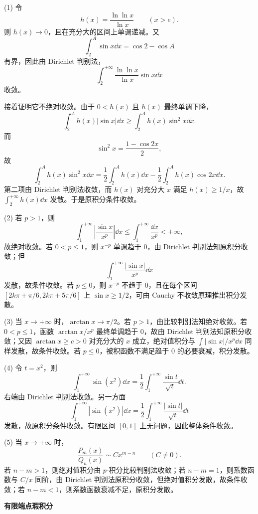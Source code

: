 \begin{solution}
	(1) 令
	\[
	h(x)=\frac{\ln\ln x}{\ln x}\qquad (x>e).
	\]
	则 $h(x)\to0$，且在充分大的区间上单调递减。又
	\[
	\int_2^A\sin x\dd x=\cos2-\cos A
	\]
	有界，因此由 Dirichlet 判别法，
	\[
	\int_2^{+\infty}\frac{\ln\ln x}{\ln x}\sin x\dd x
	\]
	收敛。
	
	接着证明它不绝对收敛。由于 $0<h(x)$ 且 $h(x)$ 最终单调下降，
	\[
	\int_2^A h(x)|\sin x|\dd x
	\geq \int_2^A h(x)\sin^2x\dd x.
	\]
	而
	\[
	\sin^2x=\frac{1-\cos2x}{2},
	\]
	故
	\[
	\int_2^A h(x)\sin^2x\dd x
	=\frac12\int_2^A h(x)\dd x-\frac12\int_2^A h(x)\cos2x\dd x.
	\]
	第二项由 Dirichlet 判别法收敛，而 $h(x)$ 对充分大 $x$ 满足 $h(x)\geq 1/x$，故 $\displaystyle\int_2^{+\infty}h(x)\dd x$ 发散。于是原积分条件收敛。
	
	(2) 若 $p>1$，则
	\[
	\int_1^{+\infty}\left|\frac{\sin x}{x^p}\right|\dd x
	\leq \int_1^{+\infty}\frac{\dd x}{x^p}<+\infty,
	\]
	故绝对收敛。若 $0<p\leq1$，则 $x^{-p}$ 单调趋于 $0$，由 Dirichlet 判别法知原积分收敛；但
	\[
	\int_1^{+\infty}\frac{|\sin x|}{x^p}\dd x
	\]
	发散，故条件收敛。若 $p\leq0$，则 $x^{-p}$ 不趋于 $0$，且在每个区间 $[2k\pi+\pi/6,2k\pi+5\pi/6]$ 上 $\sin x\geq1/2$，可由 Cauchy 不收敛原理推出积分发散。
	
	(3) 当 $x\to+\infty$ 时，$\arctan x\to\pi/2$。若 $p>1$，由比较判别法知绝对收敛。若 $0<p\leq1$，函数 $\arctan x/x^p$ 最终单调趋于 $0$，故由 Dirichlet 判别法知原积分收敛；又因 $\arctan x\geq c>0$ 对充分大的 $x$ 成立，绝对值积分与 $\displaystyle\int |\sin x|/x^p\dd x$ 同样发散，故条件收敛。若 $p\leq0$，被积函数不满足趋于 $0$ 的必要衰减，积分发散。
	
	(4) 令 $t=x^2$，则
	\[
	\int_1^{+\infty}\sin(x^2)\dd x
	=\frac12\int_1^{+\infty}\frac{\sin t}{\sqrt t}\dd t.
	\]
	右端由 Dirichlet 判别法收敛。另一方面
	\[
	\int_1^{+\infty}|\sin(x^2)|\dd x
	=\frac12\int_1^{+\infty}\frac{|\sin t|}{\sqrt t}\dd t
	\]
	发散，故原积分条件收敛。有限区间 $[0,1]$ 上无问题，因此整体条件收敛。
	
	(5) 当 $x\to+\infty$ 时，
	\[
	\frac{P_m(x)}{Q_n(x)}\sim Cx^{m-n}\qquad(C\neq0).
	\]
	若 $n-m>1$，则绝对值积分由 $p$-积分比较判别法收敛；若 $n-m=1$，则系数函数与 $C/x$ 同阶，由 Dirichlet 判别法原积分收敛，但绝对值积分发散，故条件收敛；若 $n-m<1$，则系数函数衰减不足，原积分发散。
\end{solution}

\textbf{有限端点瑕积分}

